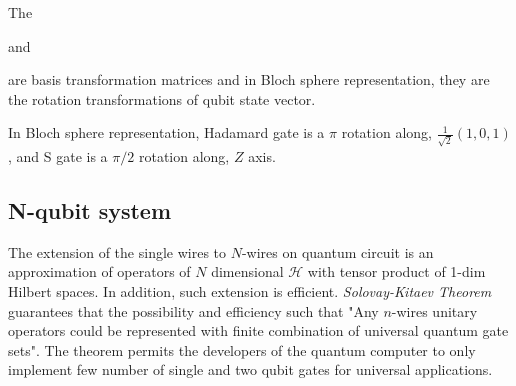 \begin{example}
    The \begin{quantikz}
        \end{quantikz} and \begin{quantikz}
    \end{quantikz} are basis transformation matrices and 
    in Bloch sphere representation, they are the rotation 
    transformations of qubit state vector.

    \begin{center}
        
        \label{fig:bloch-sphere-example}
    \end{center}

    In Bloch sphere representation, Hadamard gate is a $\pi$ rotation along, $\frac{1}{\sqrt{2}}(1, 0, 1)$,
    and S gate is a $\pi/2$ rotation along, $Z$ axis.
    \begin{center}
        
        
        \label{fig:h-s-rotation}
    \end{center}
\end{example}


\subsection{N-qubit system}

%
%

The extension of the single wires to $N$-wires on quantum circuit is 
an approximation of operators of $N$ dimensional $\mathcal{H}$ with tensor product of 1-dim Hilbert spaces. 
In addition, such extension is efficient.
\textit{Solovay-Kitaev Theorem} guarantees that the possibility and efficiency
such that "Any $n$-wires unitary operators could be represented with finite combination of 
universal quantum gate sets". 
The theorem permits the developers of the quantum computer to only implement 
few number of single and two qubit gates for universal applications.

